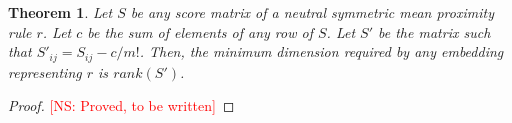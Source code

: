 \documentclass[10pt,letterpaper]{article}
\newtheorem{theorem}{Theorem}
\newcommand{\kibitz}[2]{\ifnum\Comments=1\textcolor{#1}{#2}\fi}
\newcommand{\cns}[1]{\kibitz{red} {[NS: #1]}}
\begin{document}
\begin{theorem}
Let $S$ be any score matrix of a neutral symmetric mean proximity rule $r$. Let $c$ be the sum of elements of any row of $S$. Let $S'$ be the matrix such that $S'_{ij} = S_{ij}-c/{m!}$. Then, the minimum dimension required by any embedding representing $r$ is $rank(S')$. 
\label{thm:dimension}
\end{theorem}
\begin{proof}
\cns{Proved, to be written}
\end{proof}
%
%
%
%
%
\end{document}
